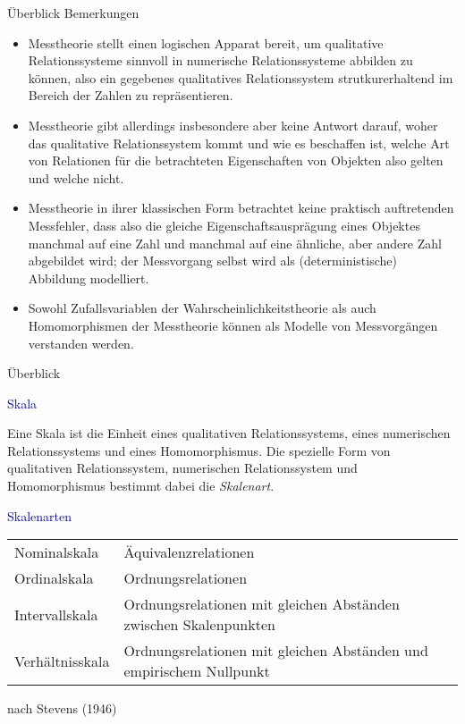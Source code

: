 \documentclass[
  8pt,
  ignorenonframetext,
]{beamer}
\begin{document}
\begin{frame}{Überblick}
\protect\hypertarget{uxfcberblick-7}{}
Bemerkungen

\small

\begin{itemize}
\item
  \justifying Messtheorie stellt einen logischen Apparat bereit, um
  qualitative Relationssysteme sinnvoll in numerische Relationssysteme
  abbilden zu können, also ein gegebenes qualitatives Relationssystem
  strutkurerhaltend im Bereich der Zahlen zu repräsentieren.
\item
  Messtheorie gibt allerdings insbesondere aber keine Antwort darauf,
  woher das qualitative Relationssystem kommt und wie es beschaffen ist,
  welche Art von Relationen für die betrachteten Eigenschaften von
  Objekten also gelten und welche nicht.
\item
  Messtheorie in ihrer klassischen Form betrachtet keine praktisch
  auftretenden Messfehler, dass also die gleiche Eigenschaftsausprägung
  eines Objektes manchmal auf eine Zahl und manchmal auf eine ähnliche,
  aber andere Zahl abgebildet wird; der Messvorgang selbst wird als
  (deterministische) Abbildung modelliert.
\item
  Sowohl Zufallsvariablen der Wahrscheinlichkeitstheorie als auch
  Homomorphismen der Messtheorie können als Modelle von Messvorgängen
  verstanden werden.
\end{itemize}
\end{frame}

\begin{frame}{Überblick}
\protect\hypertarget{uxfcberblick-8}{}
\vspace{1mm}

\textcolor{darkblue}{Skala}

Eine Skala ist die Einheit eines qualitativen Relationssystems, eines
numerischen Relationssystems und eines Homomorphismus. Die spezielle
Form von qualitativen Relationssystem, numerischen Relationssystem und
Homomorphismus bestimmt dabei die \emph{Skalenart}.

\vspace{3mm}

\textcolor{darkblue}{Skalenarten}

\small
\begin{tabular}{ll}
Nominalskala    & Äquivalenzrelationen                                                \\
Ordinalskala    & Ordnungsrelationen                                                  \\
Intervallskala  & Ordnungsrelationen mit gleichen Abständen zwischen Skalenpunkten    \\
Verhältnisskala & Ordnungsrelationen mit gleichen Abständen und empirischem Nullpunkt \\
\end{tabular}

\flushright
\footnotesize

nach Stevens (1946)
\end{frame}
\end{document}
